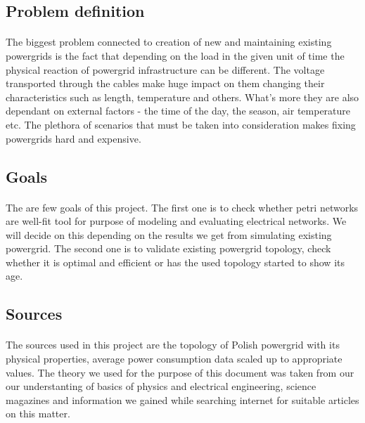 \documentclass[a4paper]{article}
\begin{document}
\subsection{Problem definition}
\label{sec:problemDefinition}
\paragraph{}
The biggest problem connected to creation of new and maintaining existing powergrids is the fact that depending on the load in the given unit of time the physical reaction of powergrid infrastructure can be different. The voltage transported through the cables make huge impact on them changing their characteristics such as length, temperature and others. What's more they are also dependant on external factors - the time of the day, the season, air temperature etc. The plethora of scenarios that must be taken into consideration makes fixing powergrids hard and expensive.

\subsection{Goals} 
\label{sec:goals}
\paragraph{}
The are few goals of this project. The first one is to check whether petri networks are well-fit tool for purpose of modeling and evaluating electrical networks. We will decide on this depending on the results we get from simulating existing powergrid. The second one is to validate existing powergrid topology, check whether it is optimal and efficient or has the used topology started to show its age. 

\subsection{Sources}
\label{sec:sources}
\paragraph{}
The sources used in this project are the topology of Polish powergrid with its physical properties, average power consumption data scaled up to appropriate values. The theory we used for the purpose of this document was taken from our our understanting of basics of physics and electrical engineering, science magazines and information we gained while searching internet for suitable articles on this matter.
\end{document}
